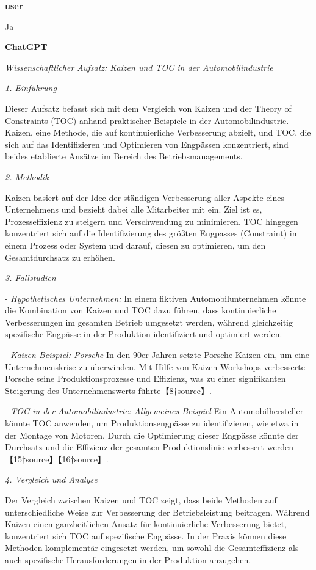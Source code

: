 \textbf{user}

Ja

\textbf{ChatGPT}

\textit{Wissenschaftlicher Aufsatz: Kaizen und TOC in der Automobilindustrie}

\textit{1. Einführung}

Dieser Aufsatz befasst sich mit dem Vergleich von Kaizen und der Theory of Constraints (TOC) anhand praktischer Beispiele in der Automobilindustrie. Kaizen, eine Methode, die auf kontinuierliche Verbesserung abzielt, und TOC, die sich auf das Identifizieren und Optimieren von Engpässen konzentriert, sind beides etablierte Ansätze im Bereich des Betriebsmanagements. 

\textit{2. Methodik}

Kaizen basiert auf der Idee der ständigen Verbesserung aller Aspekte eines Unternehmens und bezieht dabei alle Mitarbeiter mit ein. Ziel ist es, Prozesseffizienz zu steigern und Verschwendung zu minimieren. TOC hingegen konzentriert sich auf die Identifizierung des größten Engpasses (Constraint) in einem Prozess oder System und darauf, diesen zu optimieren, um den Gesamtdurchsatz zu erhöhen.

\textit{3. Fallstudien}

- \textit{Hypothetisches Unternehmen:} In einem fiktiven Automobilunternehmen könnte die Kombination von Kaizen und TOC dazu führen, dass kontinuierliche Verbesserungen im gesamten Betrieb umgesetzt werden, während gleichzeitig spezifische Engpässe in der Produktion identifiziert und optimiert werden.

- \textit{Kaizen-Beispiel: Porsche}
In den 90er Jahren setzte Porsche Kaizen ein, um eine Unternehmenskrise zu überwinden. Mit Hilfe von Kaizen-Workshops verbesserte Porsche seine Produktionsprozesse und Effizienz, was zu einer signifikanten Steigerung des Unternehmenswerts führte【8†source】.

- \textit{TOC in der Automobilindustrie: Allgemeines Beispiel}
Ein Automobilhersteller könnte TOC anwenden, um Produktionsengpässe zu identifizieren, wie etwa in der Montage von Motoren. Durch die Optimierung dieser Engpässe könnte der Durchsatz und die Effizienz der gesamten Produktionslinie verbessert werden【15†source】【16†source】.

\textit{4. Vergleich und Analyse}

Der Vergleich zwischen Kaizen und TOC zeigt, dass beide Methoden auf unterschiedliche Weise zur Verbesserung der Betriebsleistung beitragen. Während Kaizen einen ganzheitlichen Ansatz für kontinuierliche Verbesserung bietet, konzentriert sich TOC auf spezifische Engpässe. In der Praxis können diese Methoden komplementär eingesetzt werden, um sowohl die Gesamteffizienz als auch spezifische Herausforderungen in der Produktion anzugehen.

